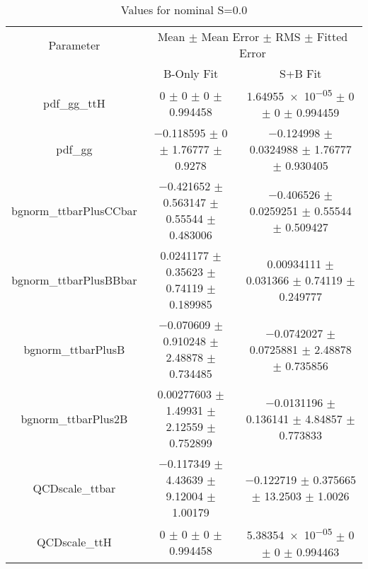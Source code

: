 \begin{table}
\centering
\caption{Values for nominal S=0.0}
\begin{tabular}{ccc}
\toprule
Parameter & \multicolumn{2}{c}{Mean $\pm$ Mean Error $\pm$ RMS $\pm$ Fitted Error}\\
 & B-Only Fit & S+B Fit\\
\midrule
pdf\_gg\_ttH & \num{0} $\pm$ \num{0} $\pm$ \num{0} $\pm$ \num{0.994458} & \num{1.64955e-05} $\pm$ \num{0} $\pm$ \num{0} $\pm$ \num{0.994459}\\
pdf\_gg & \num{-0.118595} $\pm$ \num{0} $\pm$ \num{1.76777} $\pm$ \num{0.9278} & \num{-0.124998} $\pm$ \num{0.0324988} $\pm$ \num{1.76777} $\pm$ \num{0.930405}\\
bgnorm\_ttbarPlusCCbar & \num{-0.421652} $\pm$ \num{0.563147} $\pm$ \num{0.55544} $\pm$ \num{0.483006} & \num{-0.406526} $\pm$ \num{0.0259251} $\pm$ \num{0.55544} $\pm$ \num{0.509427}\\
bgnorm\_ttbarPlusBBbar & \num{0.0241177} $\pm$ \num{0.35623} $\pm$ \num{0.74119} $\pm$ \num{0.189985} & \num{0.00934111} $\pm$ \num{0.031366} $\pm$ \num{0.74119} $\pm$ \num{0.249777}\\
bgnorm\_ttbarPlusB & \num{-0.070609} $\pm$ \num{0.910248} $\pm$ \num{2.48878} $\pm$ \num{0.734485} & \num{-0.0742027} $\pm$ \num{0.0725881} $\pm$ \num{2.48878} $\pm$ \num{0.735856}\\
bgnorm\_ttbarPlus2B & \num{0.00277603} $\pm$ \num{1.49931} $\pm$ \num{2.12559} $\pm$ \num{0.752899} & \num{-0.0131196} $\pm$ \num{0.136141} $\pm$ \num{4.84857} $\pm$ \num{0.773833}\\
QCDscale\_ttbar & \num{-0.117349} $\pm$ \num{4.43639} $\pm$ \num{9.12004} $\pm$ \num{1.00179} & \num{-0.122719} $\pm$ \num{0.375665} $\pm$ \num{13.2503} $\pm$ \num{1.0026}\\
QCDscale\_ttH & \num{0} $\pm$ \num{0} $\pm$ \num{0} $\pm$ \num{0.994458} & \num{5.38354e-05} $\pm$ \num{0} $\pm$ \num{0} $\pm$ \num{0.994463}\\
\bottomrule
\end{tabular}
\end{table}